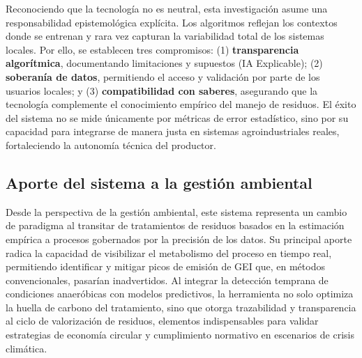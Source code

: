 Reconociendo que la tecnología no es neutral, esta investigación asume una responsabilidad epistemológica explícita. Los algoritmos reflejan los contextos donde se entrenan y rara vez capturan la variabilidad total de los sistemas locales. Por ello, se establecen tres compromisos: (1) \textbf{transparencia algorítmica}, documentando limitaciones y supuestos (IA Explicable); (2) \textbf{soberanía de datos}, permitiendo el acceso y validación por parte de los usuarios locales; y (3) \textbf{compatibilidad con saberes}, asegurando que la tecnología complemente el conocimiento empírico del manejo de residuos. El éxito del sistema no se mide únicamente por métricas de error estadístico, sino por su capacidad para integrarse de manera justa en sistemas agroindustriales reales, fortaleciendo la autonomía técnica del productor.

\subsection*{Aporte del sistema a la gestión ambiental}

Desde la perspectiva de la gestión ambiental, este sistema representa un cambio de paradigma al transitar de tratamientos de residuos basados en la estimación empírica a procesos gobernados por la precisión de los datos. Su principal aporte radica la capacidad de visibilizar el metabolismo del proceso en tiempo real, permitiendo identificar y mitigar picos de emisión de GEI que, en métodos convencionales, pasarían inadvertidos. Al integrar la detección temprana de condiciones anaeróbicas con modelos predictivos, la herramienta no solo optimiza la huella de carbono del tratamiento, sino que otorga trazabilidad y transparencia al ciclo de valorización de residuos, elementos indispensables para validar estrategias de economía circular y cumplimiento normativo en escenarios de crisis climática.